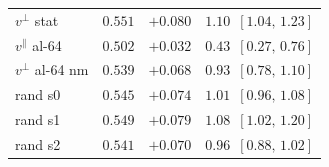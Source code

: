 \begin{tabular}{lccc}
$v^{\perp}$ stat & $0.551$ & $+0.080$ & $1.10$ \,{\scriptsize $[1.04,\, 1.23]$} \\
$v^{\parallel}$ al-64 & $0.502$ & $+0.032$ & $0.43$ \,{\scriptsize $[0.27,\, 0.76]$} \\
$v^{\perp}$ al-64 nm & $0.539$ & $+0.068$ & $0.93$ \,{\scriptsize $[0.78,\, 1.10]$} \\
rand s0 & $0.545$ & $+0.074$ & $1.01$ \,{\scriptsize $[0.96,\, 1.08]$} \\
rand s1 & $0.549$ & $+0.079$ & $1.08$ \,{\scriptsize $[1.02,\, 1.20]$} \\
rand s2 & $0.541$ & $+0.070$ & $0.96$ \,{\scriptsize $[0.88,\, 1.02]$} \\
\bottomrule
\end{tabular}
